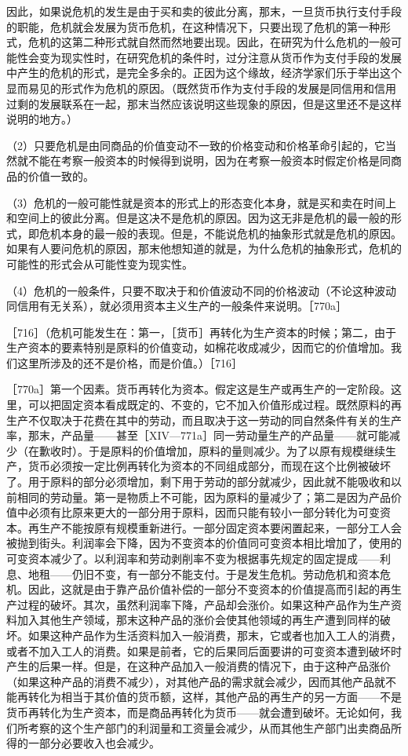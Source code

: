 因此，如果说危机的发生是由于买和卖的彼此分离，那末，一旦货币执行支付手段的职能，危机就会发展为货币危机，在这种情况下，只要出现了危机的第一种形式，危机的这第二种形式就自然而然地要出现。因此，在研究为什么危机的一般可能性会变为现实性时，在研究危机的条件时，过分注意从货币作为支付手段的发展中产生的危机的形式，是完全多余的。正因为这个缘故，经济学家们乐于举出这个显而易见的形式作为危机的原因。（既然货币作为支付手段的发展是同信用和信用过剩的发展联系在一起，那末当然应该说明这些现象的原因，但是这里还不是这样说明的地方。）

（2）只要危机是由同商品的价值变动不一致的价格变动和价格革命引起的，它当然就不能在考察一般资本的时候得到说明，因为在考察一般资本时假定价格是同商品的价值一致的。

（3）危机的一般可能性就是资本的形式上的形态变化本身，就是买和卖在时间上和空间上的彼此分离。但是这决不是危机的原因。因为这无非是危机的最一般的形式，即危机本身的最一般的表现。但是，不能说危机的抽象形式就是危机的原因。如果有人要问危机的原因，那末他想知道的就是，为什么危机的抽象形式，危机的可能性的形式会从可能性变为现实性。

（4）危机的一般条件，只要不取决于和价值波动不同的价格波动（不论这种波动同信用有无关系），就必须用资本主义生产的一般条件来说明。［770a］

［716］（危机可能发生在：第一，［货币］再转化为生产资本的时候；第二，由于生产资本的要素特别是原料的价值变动，如棉花收成减少，因而它的价值增加。我们这里所涉及的还不是价格，而是价值。）［716］

［770a］第一个因素。货币再转化为资本。假定这是生产或再生产的一定阶段。这里，可以把固定资本看成既定的、不变的，它不加入价值形成过程。既然原料的再生产不仅取决于花费在其中的劳动，而且取决于这一劳动的同自然条件有关的生产率，那末，产品量——甚至［XIV—771a］同一劳动量生产的产品量——就可能减少（在歉收时）。于是原料的价值增加，原料的量则减少。为了以原有规模继续生产，货币必须按一定比例再转化为资本的不同组成部分，而现在这个比例被破坏了。用于原料的部分必须增加，剩下用于劳动的部分就减少，因此就不能吸收和以前相同的劳动量。第一是物质上不可能，因为原料的量减少了；第二是因为产品价值中必须有比原来更大的一部分用于原料，因而只能有较小一部分转化为可变资本。再生产不能按原有规模重新进行。一部分固定资本要闲置起来，一部分工人会被抛到街头。利润率会下降，因为不变资本的价值同可变资本相比增加了，使用的可变资本减少了。以利润率和劳动剥削率不变为根据事先规定的固定提成——利息、地租——仍旧不变，有一部分不能支付。于是发生危机。劳动危机和资本危机。因此，这就是由于靠产品价值补偿的一部分不变资本的价值提高而引起的再生产过程的破坏。其次，虽然利润率下降，产品却会涨价。如果这种产品作为生产资料加入其他生产领域，那末这种产品的涨价会使其他领域的再生产遭到同样的破坏。如果这种产品作为生活资料加入一般消费，那末，它或者也加入工人的消费，或者不加入工人的消费。如果是前者，它的后果同后面要讲的可变资本遭到破坏时产生的后果一样。但是，在这种产品加入一般消费的情况下，由于这种产品涨价（如果这种产品的消费不减少），对其他产品的需求就会减少，因而其他产品就不能再转化为相当于其价值的货币额，这样，其他产品的再生产的另一方面——不是货币再转化为生产资本，而是商品再转化为货币——就会遭到破坏。无论如何，我们所考察的这个生产部门的利润量和工资量会减少，从而其他生产部门出卖商品所得的一部分必要收入也会减少。

